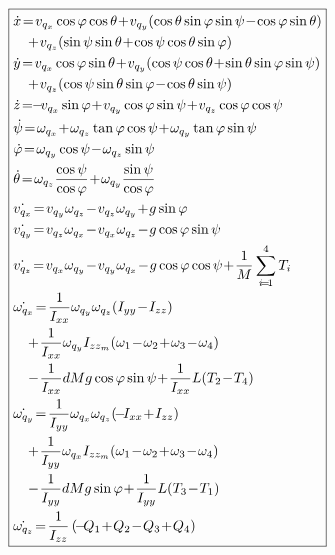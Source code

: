 \documentclass[conference]{IEEEtran}
\begin{document}
\begin{equation}
\small
\boxed{\begin{aligned}&\dot{x}\!=\!v_{q_x} \cos \varphi \cos \theta \!+\! v_{q_y} ( \cos \theta \sin \varphi \sin \psi\!-\!\cos \varphi \sin \theta )\\
&\quad \!+\! v_{q_z}(\sin \psi \sin \theta \!+\! \cos \psi \cos \theta \sin \varphi)\\
&\dot{y}\!=\!v_{q_x} \cos \varphi \sin \theta \!+\! v_{q_y} (\cos \psi \cos \theta \!+\! \sin \theta \sin \varphi \sin \psi)\\
&\quad\!+\! v_{q_z}( \cos \psi \sin \theta \sin \varphi\!-\!\cos \theta \sin \psi )\\
&\dot{z}\!=\! \!-\!v_{q_x} \sin \varphi  \!+\! v_{q_y} \cos \varphi \sin \psi  \!+\! v_{q_z}\cos \varphi \cos \psi\\
&\dot{\psi}\!=\!\omega_{q_x} \!+\! \omega_{q_z}\tan\varphi \cos\psi \!+\! \omega_{q_y}\tan\varphi \sin\psi\\
&\dot{\varphi}\!=\!\omega_{q_y}\cos \psi \!-\! \omega_{q_z}\sin\psi\\
&\dot{\theta}\!=\!\omega_{q_z} \frac{\cos\psi}{\cos\varphi}  \!+\! \omega_{q_y}\frac{\sin\psi}{\cos\varphi}\\
&\dot{v_{q_x}}\!=\!v_{q_y} \omega_{q_z} \!-\! v_{q_z} \omega_{q_y}\!+\!g\sin\varphi\\
&\dot{v_{q_y}}\!=\!v_{q_z} \omega_{q_x} \!-\! v_{q_x} \omega_{q_z}\!-\!g\cos\varphi\sin\psi\\
&\dot{v_{q_z}}\!=\!v_{q_x} \omega_{q_y} \!-\! v_{q_y} \omega_{q_x}\!-\!g\cos\varphi\cos\psi\!+\!\frac{1}{M}\sum_{i\!=\!1}^4T_i\\
&\dot{\omega_{q_x}}\!=\!\frac{1}{I_{xx}}\omega_{q_y}\omega_{q_z}(I_{yy}\!-\!I_{zz})\\
&\quad\!+\!\frac{1}{I_{xx}}\omega_{q_y}I_{zz_m}(\omega_1\!-\!\omega_2\!+\!\omega_3\!-\!\omega_4)\\
&\quad\!-\!\frac{1}{I_{xx}}dMg\cos\varphi\sin\psi\!+\!\frac{1}{I_{xx}}L(T_2\!-\!T_4)\\
&\dot{\omega_{q_y}}\!=\!\frac{1}{I_{yy}}\omega_{q_x}\omega_{q_z}(\!-\!I_{xx}\!+\!I_{zz})\\
&\quad\!+\!\frac{1}{I_{yy}}\omega_{q_x}I_{zz_m}(\omega_1\!-\!\omega_2\!+\!\omega_3\!-\!\omega_4)\\
&\quad\!-\!\frac{1}{I_{yy}}dMg\sin\varphi\!+\!\frac{1}{I_{yy}}L(T_3\!-\!T_1)\\
&\dot{\omega_{q_z}}\!=\!\frac{1}{I_{zz}}\left(\!-\!Q_1\!+\!Q_2\!-\!Q_3\!+\!Q_4\right)\\
\end{aligned}}
\label{eq:modelo}
\end{equation}
\end{document}

